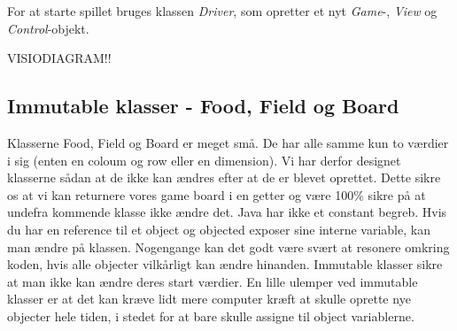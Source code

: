 For at starte spillet bruges klassen \textit{Driver}, som opretter et nyt \textit{Game}-, \textit{View} og \textit{Control}-objekt.

VISIODIAGRAM!!

\subsection*{Immutable klasser - Food, Field og Board}
Klasserne Food, Field og Board er meget små. De har alle samme kun to værdier i sig (enten en coloum og row eller en dimension). Vi har derfor designet klasserne sådan at de ikke kan ændres efter at de er blevet oprettet. Dette sikre os at vi kan returnere vores game board i en getter og være 100\% sikre på at undefra kommende klasse ikke ændre det. Java har ikke et constant begreb. Hvis du har en reference til et object og objected exposer sine interne variable,  kan man ændre på klassen. Nogengange kan det godt være svært at resonere omkring koden, hvis alle objecter vilkårligt kan ændre hinanden. Immutable klasser sikre at man ikke kan ændre deres start værdier. En lille ulemper ved immutable klasser er at det kan kræve lidt mere computer kræft at skulle oprette nye objecter hele tiden, i stedet for at bare skulle assigne til object variablerne.
